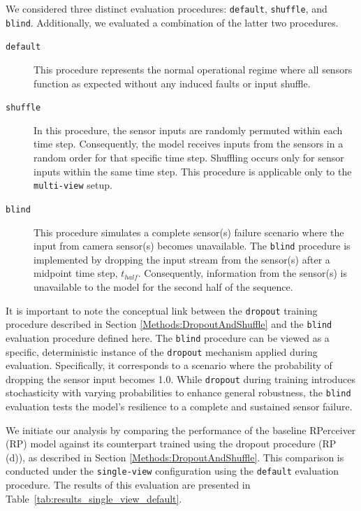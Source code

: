 We considered three distinct evaluation procedures: \texttt{default}, \texttt{shuffle}, and \texttt{blind}. Additionally, we evaluated a combination of the latter two procedures.

\begin{description}
    \item[\texttt{default}] This procedure represents the normal operational regime where all sensors function as expected without any induced faults or input shuffle.

    \item[\texttt{shuffle}] In this procedure, the sensor inputs are randomly permuted within each time step. Consequently, the model receives inputs from the sensors in a random order for that specific time step. Shuffling occurs only for sensor inputs within the same time step. This procedure is applicable only to the \texttt{multi-view} setup.

    \item[\texttt{blind}] This procedure simulates a complete sensor(s) failure scenario where the input from camera sensor(s) becomes unavailable. The \texttt{blind} procedure is implemented by dropping the input stream from the sensor(s) after a midpoint time step, $t_{half}$. Consequently, information from the sensor(s) is unavailable to the model for the second half of the sequence.
\end{description}

It is important to note the conceptual link between the \texttt{dropout} training procedure described in Section \ref{Methods:DropoutAndShuffle} and the \texttt{blind} evaluation procedure defined here. The \texttt{blind} procedure can be viewed as a specific, deterministic instance of the \texttt{dropout} mechanism applied during evaluation. Specifically, it corresponds to a scenario where the probability of dropping the sensor input becomes 1.0. While \texttt{dropout} during training introduces stochasticity with varying probabilities to enhance general robustness, the \texttt{blind} evaluation tests the model's resilience to a complete and sustained sensor failure.

We initiate our analysis by comparing the performance of the baseline RPerceiver (RP) model against its counterpart trained using the dropout procedure (RP (d)), as described in Section \ref{Methods:DropoutAndShuffle}. This comparison is conducted under the \texttt{single-view} configuration using the \texttt{default} evaluation procedure. The results of this evaluation are presented in Table~\ref{tab:results_single_view_default}.

